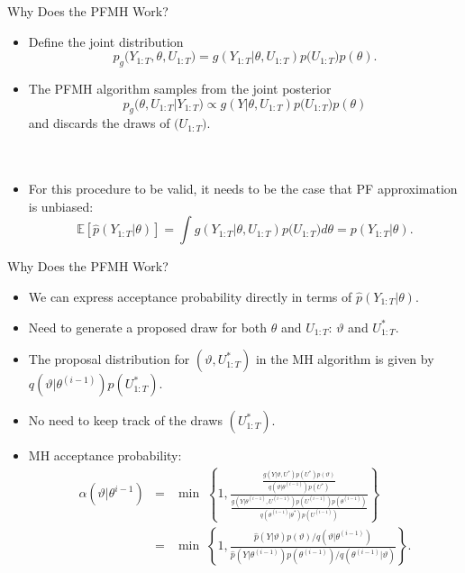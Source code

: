 \documentclass[presentation]{beamer}
\begin{document}
\begin{frame}[label={sec:org9fc9bb4}]{Why Does the PFMH Work?}
\begin{itemize}
\item Define the joint distribution
\[
     p_g\big( Y_{1:T},\theta,U_{1:T} \big) = g(Y_{1:T}|\theta,U_{1:T}) p\big(U_{1:T} \big) p(\theta).
     \]
\item The PFMH algorithm samples from the joint posterior
 \[
      p_g\big( \theta, U_{1:T} | Y_{1:T} \big) \propto g(Y|\theta,U_{1:T}) p\big(U_{1:T} \big) p(\theta)
      \]
 and discards the draws of \(\big( U_{1:T} \big)\).
\\~\\~
\item For this procedure to be valid, it needs to be the case that PF approximation is unbiased:
\[
     \mathbb{E}[\hat{p}(Y_{1:T}|\theta)]
     = \int g(Y_{1:T}|\theta,U_{1:T})p\big(U_{1:T} \big) d\theta
     = p(Y_{1:T}|\theta).
     \]
\end{itemize}
\end{frame}

\begin{frame}[label={sec:org2f6023b}]{Why Does the PFMH Work?}
\begin{itemize}
\item We can express acceptance probability directly in terms of \(\hat{p}(Y_{1:T}|\theta)\).
\item Need to generate a proposed draw for both \(\theta\) and \(U_{1:T}\): \(\vartheta\) and \(U_{1:T}^*\).
\item The proposal distribution for \((\vartheta,U_{1:T}^*)\) in the MH algorithm is given by \(q(\vartheta|\theta^{(i-1)}) p(U_{1:T}^*)\).
\item No need to keep track of the draws \((U_{1:T}^*)\).
\item MH acceptance probability:
\begin{eqnarray*}
	\alpha(\vartheta|\theta^{i-1})
	&=&
	\min \; \left\{ 1,
	\frac{ \frac{ g(Y|\vartheta,U^*)p(U^*) p(\vartheta)}{ q(\vartheta|\theta^{(i-1)}) p(U^*) } }{
	      \frac{ g(Y|\theta^{(i-1)},U^{(i-1)})p(U^{(i-1)}) p(\theta^{(i-1)})}{ q(\theta^{(i-1)}|\theta^*) p(U^{(i-1)})} } \right\} \\
	&=&	    \min \; \left\{ 1,
	\frac{	\hat{p}(Y|\vartheta)p(\vartheta) \big/ q(\vartheta|\theta^{(i-1)})  }{
	      \hat{p}(Y|\theta^{(i-1)})p(\theta^{(i-1)}) \big/ q(\theta^{(i-1)}|\vartheta) } \right\}. 
\end{eqnarray*}
\end{itemize}
\end{frame}
\end{document}
